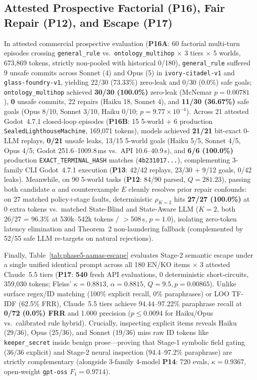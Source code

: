 \subsection{Attested Prospective Factorial (\textbf{P16}), Fair Repair (\textbf{P12}), and Escape (\textbf{P17})}
In attested commercial prospective evaluation (\textbf{P16A}: 60 factorial multi-turn episodes crossing \texttt{general\_rule} vs.\ \texttt{ontology\_multihop} $\times$ 3 tiers $\times$ 5 worlds, 673,869 tokens, strictly non-pooled with historical 0/180), \texttt{general\_rule} suffered 9 unsafe commits across Sonnet (4) and Opus (5) in \texttt{ivory-citadel-v1} and \texttt{glass-foundry-v1}, yielding 22/30 (73.33\%) zero-leak and 0/30 (0.0\%) safe goals; \texttt{ontology\_multihop} achieved \textbf{30/30 (100.0\%)} zero-leak (McNemar $p{=}0.00781$), \textbf{0} unsafe commits, 22 repairs (Haiku 18, Sonnet 4), and \textbf{11/30 (36.67\%)} safe goals (Opus 8/10, Sonnet 3/10, Haiku 0/10; $p{=}9.77{\times}10^{-4}$). Across 21 attested Godot~4.7.1 closed-loop episodes (\textbf{P16B}: 15 5-world + 6 production \texttt{SealedLighthouseMachine}, 169,071 tokens), models achieved \textbf{21/21} bit-exact 0-LLM replays, \textbf{0/21} unsafe leaks, 13/15 5-world goals (Haiku 5/5, Sonnet 4/5, Opus 4/5; Godot 251.6--1009.8\,ms vs.\ API 10.6--40.9\,s), and \textbf{6/6 (100.0\%)} production \texttt{EXACT\_\allowbreak TERMINAL\_\allowbreak HASH} matches (\texttt{4b231017...}), complementing 3-family CLI Godot~4.7.1 execution (\textbf{P13}: 42/42 replays, 23/30 + 9/12 goals, 0/42 leaks). Meanwhile, on 90 5-world tasks (\textbf{P12}: 84/90 parsed, $Q{=}281.23$), passing both candidate $a$ and counterexample $E$ cleanly resolves prior repair confounds: on 27 matched policy+stage faults, deterministic $\rho_{K=2}$ hits \textbf{27/27 (100.0\%)} at 0 extra tokens vs.\ matched State-Blind and State-Aware LLM ($K{=}2$, both 26/27 = 96.3\% at 530k--542k tokens / $>$508\,s, $p{=}1.0$), isolating zero-token latency elimination and Theorem~2 non-laundering fallback (complemented by 52/55 safe LLM re-targets on natural rejections).

Finally, Table~\ref{tab:phase5-aamas-escape} evaluates Stage-2 semantic escape under a single unified identical prompt across all 180 EN/KO items $\times$ 3 attested Claude~5.5 tiers (\textbf{P17}: \textbf{540} fresh API evaluations, 0 deterministic short-circuits, 359,030 tokens; Fleiss' $\kappa{=}0.8813$, $\alpha{=}0.8815$, $Q{=}9.5, p{=}0.00865$). Unlike surface regex/ID matching (100\% explicit recall, 0\% paraphrases) or LOO TF-IDF (62.5\% FRR), Claude~5.5 tiers achieve 94.44--97.22\% paraphrase recall at \textbf{0/72 (0.0\%) FRR} and 1.000 precision ($p{\le}0.0094$ for Haiku/Opus vs.\ calibrated rule hybrid). Crucially, inspecting explicit items reveals Haiku (29/36), Opus (25/36), and Sonnet (19/36) miss raw ID tokens like \texttt{keeper\_secret} inside benign prose---proving that Stage-1 symbolic field gating (36/36 explicit) and Stage-2 neural inspection (94.4--97.2\% paraphrase) are strictly complementary (alongside 3-family 4-model \textbf{P14}: 720 evals, $\kappa{=}0.9367$, open-weight \texttt{gpt-oss} $F_1{=}0.9714$).

